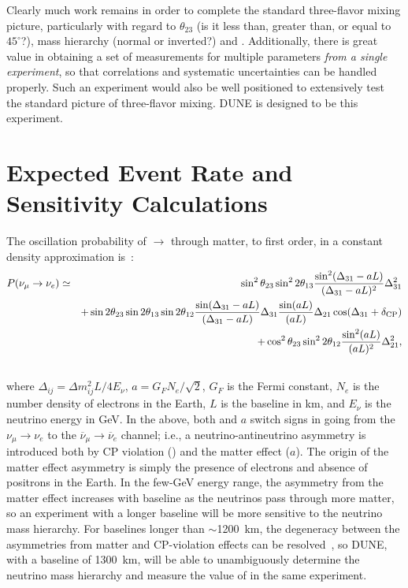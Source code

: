 Clearly much work remains in order to complete the standard three-flavor 
mixing picture, particularly 
with regard to $\theta_{23}$ (is it less than, greater than, or equal
to $45^\circ$?), mass hierarchy (normal or inverted?) 
and \deltacp.
Additionally, there is 
great value in obtaining a set of measurements for multiple parameters 
\emph{from a single experiment}, so that correlations and systematic 
uncertainties can be handled properly.  Such an experiment would also be 
well positioned to extensively test the standard picture of three-flavor mixing.  
DUNE is designed to be this experiment.

\section{Expected Event Rate and Sensitivity Calculations}
\label{sec:physics-lbnosc-senscalc}

The oscillation probability of \numu $\rightarrow$ \nue through matter, 
to first order, in a constant density
approximation is~\cite{Nunokawa:2007qh}:
%
\begin{eqnarray}
\label{eq:oscprob}
P(\nu_\mu \rightarrow \nu_e) & \simeq & \sin^2 \theta_{23} \sin^2 2 \theta_{13} 
\frac{ \sin^2(\Delta_{31} - aL)}{(\Delta_{31}-aL)^2} \Delta_{31}^2\\ \nonumber
& & + \sin 2 \theta_{23} \sin 2 \theta_{13} \sin 2 \theta_{12} \frac{ \sin(\Delta_{31} - aL)}{(\Delta_{31}-aL)} \Delta_{31} \frac{\sin(aL)}{(aL)} \Delta_{21} \cos (\Delta_{31} + \mdeltacp)\\ \nonumber
& & + \cos^2 \theta_{23} \sin^2 2 \theta_{12} \frac {\sin^2(aL)}{(aL)^2} \Delta_{21}^2, \\ \nonumber
\end{eqnarray}
where $\Delta_{ij} = \Delta m^2_{ij} L/4E_\nu$, $a = G_FN_e/\sqrt{2}$, $G_F$ is the Fermi constant, $N_e$ is the number density of electrons in the Earth, $L$ is the baseline in km, and $E_\nu$ is the neutrino energy in GeV. 
In the above, both \deltacp and $a$ 
switch signs in going from the
$\nu_\mu \to \nu_e$ to the $\overline{\nu}_\mu \to \overline{\nu}_e$ channel; i.e.,
a neutrino-antineutrino asymmetry is introduced both by CP violation (\deltacp)
and the matter effect ($a$). The origin of the matter effect asymmetry 
is simply the presence of electrons and absence of positrons in the Earth.  
In the few-GeV energy range, the asymmetry from the matter effect increases with baseline as the neutrinos
pass through more matter, so an experiment with a longer baseline will be
more sensitive to the neutrino mass hierarchy. For baselines longer than 
$\sim$1200~km, the degeneracy between the asymmetries from matter
and CP-violation effects can be resolved~\cite{Bass:2013vcg}, so DUNE, with a baseline of 1300~km, 
will be able to unambiguously
determine the neutrino mass hierarchy and measure the value of \deltacp in the same experiment.

